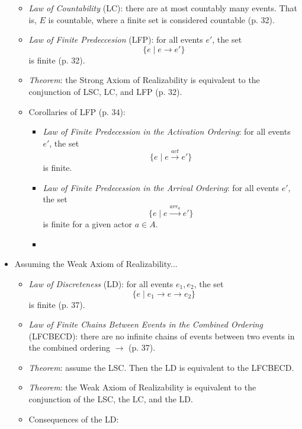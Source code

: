 \begin{itemize}
\begin{itemize}
	\item \emph{Law of Countability} (LC): there are at most countably many events. That is, $E$ is countable, where a finite set is considered countable (p. 32).
	\item \emph{Law of Finite Predeccesion} (LFP): for all events $e'$, the set
		\begin{equation*}
			\{e \mid e \rightarrow e'\}
		\end{equation*}
	is finite (p. 32).
	\item \emph{Theorem}: the Strong Axiom of Realizability is equivalent to the conjunction of LSC, LC, and LFP (p. 32).
	\item Corollaries of LFP (p. 34):
		\begin{itemize}
		\item \emph{Law of Finite Predecession in the Activation Ordering}: for all events $e'$, the set
			\begin{equation*}
				\{e \mid e \overset{act}{\longrightarrow} e'\}
			\end{equation*}
		is finite.
		\item \emph{Law of Finite Predecession in the Arrival Ordering}: for all events $e'$, the set
			\begin{equation*}
				\{e \mid e \overset{arr_a}{\longrightarrow} e'\}
			\end{equation*}
		is finite for a given actor $a \in A$.
		\item
		\end{itemize}
	\end{itemize}
\item Assuming the Weak Axiom of Realizability...
	\begin{itemize}
	\item \emph{Law of Discreteness} (LD): for all events $e_1, e_2$, the set
		\begin{equation*}
			\{e \mid e_1 \rightarrow e \rightarrow e_2\}
		\end{equation*}
	is finite (p. 37).
	\item \emph{Law of Finite Chains Between Events in the Combined Ordering} (LFCBECD): there are no infinite chains of events between two events in the combined ordering $\rightarrow$ (p. 37).
	\item \emph{Theorem}: assume the LSC. Then the LD is equivalent to the LFCBECD.
	\item \emph{Theorem}: the Weak Axiom of Realizability is equivalent to the conjunction of the LSC, the LC, and the LD.
	\item Consequences of the LD:

\end{itemize}
\end{itemize}
